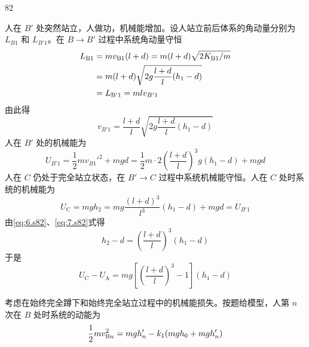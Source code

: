 \begin{solution}{82}
\begin{subsolution}
\begin{subsubsolution}
            人在 $B'$ 处突然站立，人做功，机械能增加。设人站立前后体系的角动量分别为 $L_{B1}$ 和 $L_{B'1}$。在 $B\rightarrow B'$ 过程中系统角动量守恒
            \begin{align}
                L_{\mathrm{B1}} &= m v_{\mathrm{B1}} (l+d) = m(l+d) \sqrt{2K_{\mathrm{B1}}/m} \notag\\
                &= m(l+d) \sqrt{2g\frac{l+d}{l}(h_{1}-d)} \notag\\
                &= L_{\mathrm{B'1}} = m l v_{B'1}
                \label{eq:4.s82}
            \end{align}
            由此得
            \begin{equation}
                v_{B'1} = \frac{l+d}{l} \sqrt{2g\frac{l+d}{l}(h_{1}-d)}
                \label{eq:5.s82}
            \end{equation}
            人在 $B'$ 处的机械能为
            \begin{equation}
                U_{B'1} = \frac{1}{2} m v_{B1}'^{2} + mgd = \frac{1}{2} m \cdot 2 \left(\frac{l+d}{l}\right)^{3} g (h_{1}-d) + mgd
                \label{eq:6.s82}
            \end{equation}
            人在 $C$ 仍处于完全站立状态，在 $B'\rightarrow C$ 过程中系统机械能守恒。人在 $C$ 处时系统的机械能为
            \begin{equation}
                U_{\mathrm{C}} = m g h_{2} = m g \frac{(l+d)^{3}}{l^{3}} (h_{1}-d) + m g d = U_{B'1}
                \label{eq:7.s82}
            \end{equation}
            由\eqref{eq:6.s82}、\eqref{eq:7.s82}式得
            \[
                h_{2} - d = \left(\frac{l+d}{l}\right)^{3} (h_{1}-d)
            \]
            于是
            \begin{equation}
                U_{\mathrm{C}} - U_{\mathrm{A}} = m g \left[ \left(\frac{l+d}{l}\right)^{3} - 1 \right] (h_{1}-d)
                \label{eq:8.s82}
            \end{equation}
        \end{subsubsolution}
        \begin{subsubsolution}
            \begin{subsubsubsolution}
                \begin{subsubsubsubsolution}
                    考虑在始终完全蹲下和始终完全站立过程中的机械能损失。按题给模型，人第 $n$ 次在 $B$ 处时系统的动能为
                    \begin{align}
                        \frac{1}{2} m v_{\mathrm{B}n}^{2} &= m g h_{n}' - k_{1}(m g h_{0} + m g h_{n}') \notag\\

\end{align}
\end{subsubsubsubsolution}
\end{subsubsubsolution}
\end{subsubsolution}
\end{subsolution}
\end{solution}
